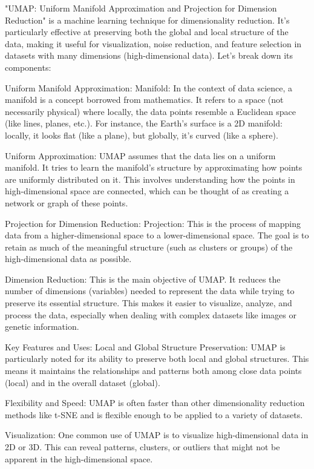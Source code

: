 \documentclass[a4paper,12pt]{article}
\begin{document}
"UMAP: Uniform Manifold Approximation and Projection for Dimension Reduction" is a machine learning technique for dimensionality reduction. It's particularly effective at preserving both the global and local structure of the data, making it useful for visualization, noise reduction, and feature selection in datasets with many dimensions (high-dimensional data). Let's break down its components:

Uniform Manifold Approximation:
Manifold: In the context of data science, a manifold is a concept borrowed from mathematics. It refers to a space (not necessarily physical) where locally, the data points resemble a Euclidean space (like lines, planes, etc.). For instance, the Earth's surface is a 2D manifold: locally, it looks flat (like a plane), but globally, it's curved (like a sphere).

Uniform Approximation: UMAP assumes that the data lies on a uniform manifold. It tries to learn the manifold's structure by approximating how points are uniformly distributed on it. This involves understanding how the points in high-dimensional space are connected, which can be thought of as creating a network or graph of these points.

Projection for Dimension Reduction:
Projection: This is the process of mapping data from a higher-dimensional space to a lower-dimensional space. The goal is to retain as much of the meaningful structure (such as clusters or groups) of the high-dimensional data as possible.

Dimension Reduction: This is the main objective of UMAP. It reduces the number of dimensions (variables) needed to represent the data while trying to preserve its essential structure. This makes it easier to visualize, analyze, and process the data, especially when dealing with complex datasets like images or genetic information.

Key Features and Uses:
Local and Global Structure Preservation: UMAP is particularly noted for its ability to preserve both local and global structures. This means it maintains the relationships and patterns both among close data points (local) and in the overall dataset (global).

Flexibility and Speed: UMAP is often faster than other dimensionality reduction methods like t-SNE and is flexible enough to be applied to a variety of datasets.

Visualization: One common use of UMAP is to visualize high-dimensional data in 2D or 3D. This can reveal patterns, clusters, or outliers that might not be apparent in the high-dimensional space.
\end{document}

